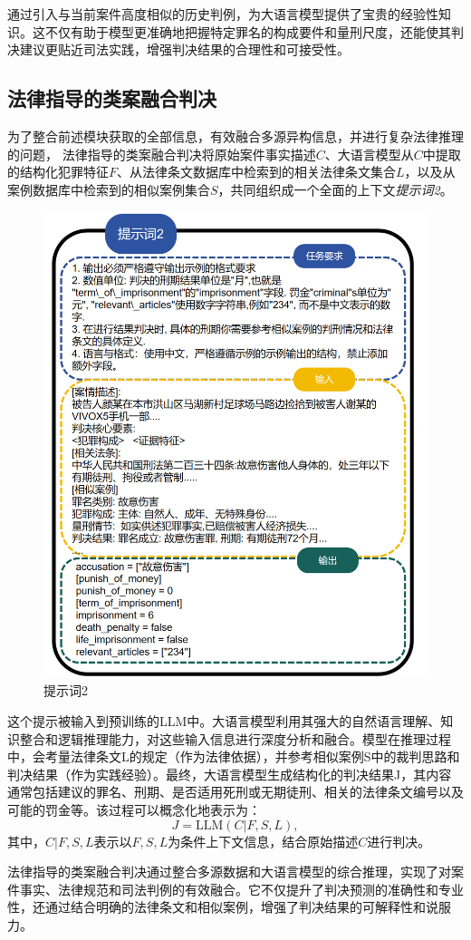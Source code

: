 通过引入与当前案件高度相似的历史判例，为大语言模型提供了宝贵的经验性知识。这不仅有助于模型更准确地把握特定罪名的构成要件和量刑尺度，还能使其判决建议更贴近司法实践，增强判决结果的合理性和可接受性。

\subsection{\heiti 法律指导的类案融合判决}

为了整合前述模块获取的全部信息，有效融合多源异构信息，并进行复杂法律推理的问题， 法律指导的类案融合判决将原始案件事实描述$C$、大语言模型从$C$中提取的结构化犯罪特征$F$、从法律条文数据库中检索到的相关法律条文集合$L$，以及从案例数据库中检索到的相似案例集合$S$，共同组织成一个全面的上下文\textit{提示词2}。

\begin{figure}[H]
	\centering
	\includegraphics[width=1\linewidth]{fig/prompt2.png}
	\caption{提示词2}
	\label{fig:prompt2}
\end{figure}

这个提示被输入到预训练的LLM中。大语言模型利用其强大的自然语言理解、知识整合和逻辑推理能力，对这些输入信息进行深度分析和融合。模型在推理过程中，会考量法律条文L的规定（作为法律依据），并参考相似案例S中的裁判思路和判决结果（作为实践经验）。最终，大语言模型生成结构化的判决结果J，其内容通常包括建议的罪名、刑期、是否适用死刑或无期徒刑、相关的法律条文编号以及可能的罚金等。该过程可以概念化地表示为：
$$
	J=\text{LLM}(C|F,S,L),
$$
其中，$C | F,S,L $表示以$F,S,L$为条件上下文信息，结合原始描述$C$进行判决。

法律指导的类案融合判决通过整合多源数据和大语言模型的综合推理，实现了对案件事实、法律规范和司法判例的有效融合。它不仅提升了判决预测的准确性和专业性，还通过结合明确的法律条文和相似案例，增强了判决结果的可解释性和说服力。